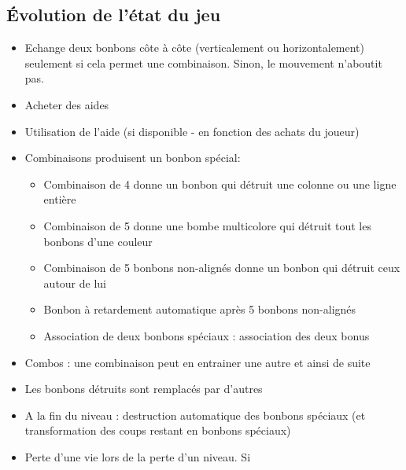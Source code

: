 \subsection{Évolution de l'état du jeu}
\begin{itemize}
    \item 
    Echange deux bonbons côte à côte (verticalement ou horizontalement) seulement si cela permet une combinaison. Sinon, le mouvement n'aboutit pas.
    \item 
    Acheter des aides
    \item 
    Utilisation de l'aide (si disponible - en fonction des achats du joueur)
    \item 
    Combinaisons produisent un bonbon spécial:
\begin{itemize}
\item
Combinaison de 4 donne un bonbon qui détruit une colonne ou une ligne entière
\item
Combinaison de 5 donne une bombe multicolore qui détruit tout les bonbons d'une couleur
\item
Combinaison de 5 bonbons non-alignés donne un bonbon qui détruit ceux autour de lui
\item
Bonbon à retardement automatique après 5 bonbons non-alignés
\item
Association de deux bonbons spéciaux : association des deux bonus
\end{itemize}
\item
Combos : une combinaison peut en entrainer une autre et ainsi de suite
\item
Les bonbons détruits sont remplacés par d'autres
\item
A la fin du niveau : destruction automatique des bonbons spéciaux (et transformation des coups restant en bonbons spéciaux)
\item
Perte d'une vie lors de la perte d'un niveau. Si 
\end{itemize}
